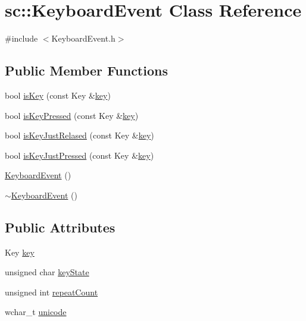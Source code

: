 \hypertarget{classsc_1_1_keyboard_event}{}\section{sc\+::Keyboard\+Event Class Reference}
\label{classsc_1_1_keyboard_event}


{\ttfamily \#include $<$Keyboard\+Event.\+h$>$}

\subsection*{Public Member Functions}
\begin{DoxyCompactItemize}
\item 
bool \mbox{\hyperlink{classsc_1_1_keyboard_event_a472b589c7fea7f7642bdc128df60159b}{is\+Key}} (const Key \&\mbox{\hyperlink{classsc_1_1_keyboard_event_a84faeb40edd8dbe75947c104c3e4cbbb}{key}})
\item 
bool \mbox{\hyperlink{classsc_1_1_keyboard_event_a79240eb3af5d68f2b0adc55ed9b39b1b}{is\+Key\+Pressed}} (const Key \&\mbox{\hyperlink{classsc_1_1_keyboard_event_a84faeb40edd8dbe75947c104c3e4cbbb}{key}})
\item 
bool \mbox{\hyperlink{classsc_1_1_keyboard_event_ae623c60adbeea0641171da736dd8f56e}{is\+Key\+Just\+Relased}} (const Key \&\mbox{\hyperlink{classsc_1_1_keyboard_event_a84faeb40edd8dbe75947c104c3e4cbbb}{key}})
\item 
bool \mbox{\hyperlink{classsc_1_1_keyboard_event_abb0ab350974c41492fc7ca60dd919b47}{is\+Key\+Just\+Pressed}} (const Key \&\mbox{\hyperlink{classsc_1_1_keyboard_event_a84faeb40edd8dbe75947c104c3e4cbbb}{key}})
\item 
\mbox{\hyperlink{classsc_1_1_keyboard_event_af5d10a6bb1ba293f05299bdc42347e39}{Keyboard\+Event}} ()
\item 
\mbox{\hyperlink{classsc_1_1_keyboard_event_ab42953e8dbaa29633f28bdc4e89ace7a}{$\sim$\+Keyboard\+Event}} ()
\end{DoxyCompactItemize}
\subsection*{Public Attributes}
\begin{DoxyCompactItemize}
\item 
Key \mbox{\hyperlink{classsc_1_1_keyboard_event_a84faeb40edd8dbe75947c104c3e4cbbb}{key}}
\item 
unsigned char \mbox{\hyperlink{classsc_1_1_keyboard_event_a69b277f5727484ee70ef84d111f0fef4}{key\+State}}
\item 
unsigned int \mbox{\hyperlink{classsc_1_1_keyboard_event_aa899d5308d0a56dc6a64e7c704dd209c}{repeat\+Count}}
\item 
wchar\+\_\+t \mbox{\hyperlink{classsc_1_1_keyboard_event_a7917fcb07afaad8403c660c12546a279}{unicode}}
\end{DoxyCompactItemize}


